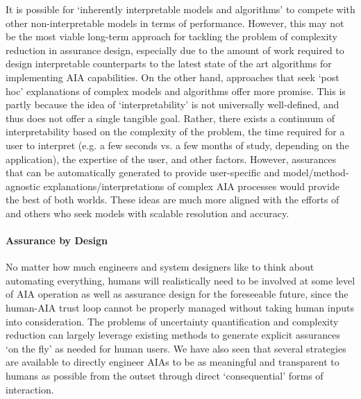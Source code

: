 It is possible for `inherently interpretable models and algorithms' to compete with other non-interpretable models in terms of performance. 
However, this may not be the most viable long-term approach for tackling the problem of complexity reduction in assurance design, especially due to the amount of work required to design interpretable counterparts to the latest state of the art algorithms for implementing AIA capabilities. 
On the other hand, approaches that seek `post hoc' explanations of complex models and algorithms offer more promise. 
This is partly because the idea of `interpretability' is not universally well-defined, and thus does not offer a single tangible goal. Rather, there exists a continuum of interpretability based on the complexity of the problem, the time required for a user to interpret (e.g. a few seconds vs. a few months of study, depending on the application), the expertise of the user, and other factors. However, assurances that can be automatically generated to provide user-specific and model/method-agnostic explanations/interpretations of complex AIA processes would provide the best of both worlds. These ideas are much more aligned with the efforts of \cite{Ruping2006-xj} and others who seek models with scalable resolution and accuracy.

\paragraph{Assurance by Design} No matter how much engineers and system designers like to think about automating everything, humans will realistically need to be involved at some level of AIA operation as well as assurance design for the foreseeable future, since the human-AIA trust loop cannot be properly managed without taking human inputs into consideration. 
The problems of uncertainty quantification and complexity reduction can largely leverage existing methods to generate explicit assurances `on the fly' as needed for human users. 
We have also seen that several strategies are available to directly engineer AIAs to be as meaningful and transparent to humans as possible from the outset through direct `consequential' forms of interaction. 

